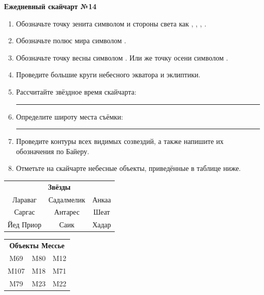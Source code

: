 \documentclass{./SAS-class-skygen}
\begin{document}
    
    
    
	\begin{center}
		\large\textbf{Ежедневный скайчарт №14}
	\end{center}

	\begin{enumerate}
		\item Обозначьте точку зенита символом  и стороны света как , , , .
		\item Обозначьте полюс мира символом .
		\item Обозначьте точку весны символом \Aries. Или же точку осени символом \Libra.
		\item Проведите большие круги небесного экватора и эклиптики.
		\item Рассчитайте звёздное время скайчарта: \rule{2cm}{0.4pt}
		\item Определите широту места съёмки: \rule{2cm}{0.4pt}
		\item Проведите контуры всех видимых созвездий, а также напишите их обозначения по Байеру.
		\item Отметьте на скайчарте небесные объекты, приведённые в таблице ниже.
	\end{enumerate}
	
    \vspace{0.5cm}

    \begin{table}[h!]
    \centering
    \begin{tabular}{ccc}
    \multicolumn{3}{c}{\textbf{Звёзды}} \\ Лараваг & Садалмелик & Анкаа \\
Саргас & Антарес & Шеат \\
Йед Приор & Саик & Хадар \\

\end{tabular}
    \hfill
    \begin{tabular}{ccc}
    \multicolumn{3}{c}{\textbf{Объекты Мессье}} \\ M69 & M80 & M12 \\
M107 & M18 & M71 \\
M79 & M23 & M22 \\

\end{tabular}
    \end{table}
	
\end{document}
